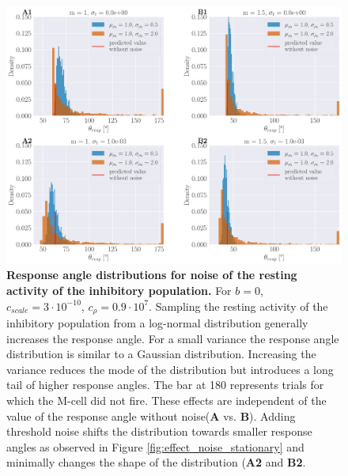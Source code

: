     \begin{figure}[H]
    	\begin{center}
			\includegraphics[width=\textwidth]{figure_stationary_rho_null_noise.pdf}
    	\end{center}
    	\caption{\textbf{Response angle distributions for noise of the resting activity of the inhibitory population.} For $b=0$, $c_{scale}=3\cdot10^{-10}$, $c_{\rho}=0.9\cdot 10^{7}$. Sampling the resting activity of the inhibitory population from a log-normal distribution generally increases the response angle. For a small variance the response angle distribution is similar to a Gaussian distribution. Increasing the variance reduces the mode of the distribution but introduces a long tail of higher response angles. The bar at 180 \textdegree{} represents trials for which the M-cell did not fire. These effects are independent of the value of the response angle without noise(\textbf{A} vs. \textbf{B}). Adding threshold noise shifts the distribution towards smaller response angles as observed in Figure \ref{fig:effect_noise_stationary} and minimally changes the shape of the distribution (\textbf{A2} and \textbf{B2}.}
    	\label{fig:effect_rho_null_stationary}
    \end{figure}
    
